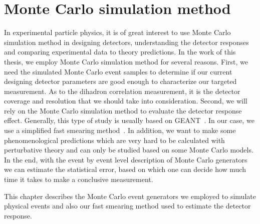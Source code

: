 \chapter{Monte Carlo simulation method} \label{chp:MC}

In experimental particle physics, it is of great interest to use Monte Carlo
simulation method in designing detectors, understanding the detector responses
and comparing experimental data to theory predictions. In the work of this
thesis, we employ Monte Carlo simulation method for several reasons. First, we
need the simulated Monte Carlo event samples to determine if our current
designing detector parameters are good enough to characterize our targeted
measurement. As to the dihadron correlation measurement, it is the detector
coverage and resolution that we should take into consideration. Second, we will
rely on the Monte Carlo simulation method to evaluate the detector response
effect. Generally, this type of study is usually based on
GEANT~\cite{Brun:1978fy}. In our case, we use a simplified fast smearing method~\cite{EICsmear}.
In addition, we want to make some phenomenological predictions which are very
hard to be calculated with perturbative theory and can only be studied based on
some Monte Carlo models. In the end, with the event by event level description
of Monte Carlo generators we can estimate the statistical error, based on which
one can decide how much time it takes to make a conclusive measurement.

This chapter describes the Monte Carlo event generators we employed to simulate
physical events and also our fast smearing method used to estimate the detector response.


